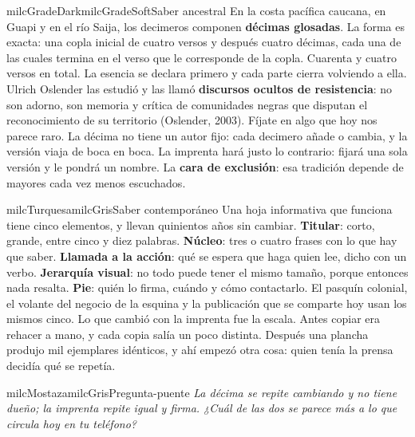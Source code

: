 \documentclass[11pt,letterpaper]{article}
\begin{document}
\begin{softbox}{milcGradeDark}{milcGradeSoft}{Saber ancestral}
En la costa pacífica caucana, en Guapi y en el río Saija, los decimeros componen \textbf{décimas glosadas}. La forma es exacta: una copla inicial de cuatro versos y después cuatro décimas, cada una de las cuales termina en el verso que le corresponde de la copla. Cuarenta y cuatro versos en total. La esencia se declara primero y cada parte cierra volviendo a ella. Ulrich Oslender las estudió y las llamó \textbf{discursos ocultos de resistencia}: no son adorno, son memoria y crítica de comunidades negras que disputan el reconocimiento de su territorio (Oslender, 2003). Fíjate en algo que hoy nos parece raro. La décima no tiene un autor fijo: cada decimero añade o cambia, y la versión viaja de boca en boca. La imprenta hará justo lo contrario: fijará una sola versión y le pondrá un nombre. La \textbf{cara de exclusión}: esa tradición depende de mayores cada vez menos escuchados.\par{}
\end{softbox}

\begin{softbox}{milcTurquesa}{milcGris}{Saber contemporáneo}
Una hoja informativa que funciona tiene cinco elementos, y llevan quinientos años sin cambiar. \textbf{Titular}: corto, grande, entre cinco y diez palabras. \textbf{Núcleo}: tres o cuatro frases con lo que hay que saber. \textbf{Llamada a la acción}: qué se espera que haga quien lee, dicho con un verbo. \textbf{Jerarquía visual}: no todo puede tener el mismo tamaño, porque entonces nada resalta. \textbf{Pie}: quién lo firma, cuándo y cómo contactarlo. El pasquín colonial, el volante del negocio de la esquina y la publicación que se comparte hoy usan los mismos cinco. Lo que cambió con la imprenta fue la escala. Antes copiar era rehacer a mano, y cada copia salía un poco distinta. Después una plancha produjo mil ejemplares idénticos, y ahí empezó otra cosa: quien tenía la prensa decidía qué se repetía.
\end{softbox}

\begin{softbox}{milcMostaza}{milcGris}{Pregunta-puente}
\textit{La décima se repite cambiando y no tiene dueño; la imprenta repite igual y firma. ¿Cuál de las dos se parece más a lo que circula hoy en tu teléfono?}
\end{softbox}
\end{document}
